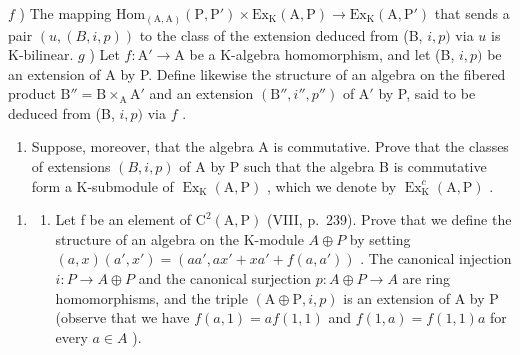 \(f\) ) The mapping \(\mathrm{Hom}_{(\mathrm{A},\mathrm{A})}(\mathrm{P},\mathrm{P}')\times \mathrm{Ex}_\mathrm{K}(\mathrm{A},\mathrm{P})\to \mathrm{Ex}_\mathrm{K}(\mathrm{A},\mathrm{P}')\) that sends a pair \((u,(B,i,p))\) to the class of the extension deduced from (B, \(i,p)\) via \(u\) is K-bilinear. \(g\) ) Let \(f:\mathrm{A}'\to \mathrm{A}\) be a K-algebra homomorphism, and let (B, \(i,p)\) be an extension of A by P. Define likewise the structure of an algebra on the fibered product \(\mathrm{B}'' = \mathrm{B}\times_{\mathrm{A}}\mathrm{A}'\) and an extension \((\mathrm{B}'' , i'', p'')\) of \(\mathrm{A}'\) by P, said to be deduced from (B, \(i,p)\) via \(f\) .

\begin{enumerate}
\def\labelenumi{\alph{enumi})}
\setcounter{enumi}{7}
\tightlist
\item
  Suppose, moreover, that the algebra A is commutative. Prove that the classes of extensions \((B,i,p)\) of A by P such that the algebra B is commutative form a K-submodule of \(\operatorname{Ex}_{\mathrm{K}}(\mathrm{A},\mathrm{P})\) , which we denote by \(\operatorname{Ex}_{\mathrm{K}}^{c}(\mathrm{A},\mathrm{P})\) .
\end{enumerate}

\begin{enumerate}
\def\labelenumi{\arabic{enumi})}
\setcounter{enumi}{10}
\tightlist
\item
  \begin{enumerate}
  \def\labelenumii{\alph{enumii})}
  \tightlist
  \item
    Let f be an element of \(\mathrm{C}^{2}(\mathrm{A},\mathrm{P})\) (VIII, p.~239). Prove that we define the structure of an algebra on the K-module \(A \oplus P\) by setting \((a,x)(a',x') = (aa',ax' + xa' + f(a,a'))\) . The canonical injection \(i: P \to A \oplus P\) and the canonical surjection \(p: A \oplus P \to A\) are ring homomorphisms, and the triple \((\mathrm{A} \oplus \mathrm{P}, i, p)\) is an extension of A by P (observe that we have \(f(a,1) = af(1,1)\) and \(f(1,a) = f(1,1)a\) for every \(a \in A\) ).
  \end{enumerate}
\end{enumerate}

